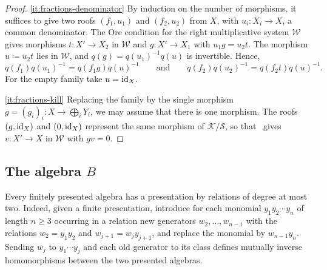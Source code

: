 \begin{proof}
  \eqref{it:fractions-denominator} By induction on the number of morphisms, it
  suffices to give two roofs $(f_1,u_1)$ and $(f_2,u_2)$ from $X$, with
  ${u_i\colon X_i\to X}$, a common denominator. The Ore condition for the right
  multiplicative system $\mathcal{W}$~\cite[Tag~04VC,
  Definition~4.27.1]{Stacks} gives morphisms ${t\colon X'\to X_2}$ in
  $\mathcal{W}$ and ${g\colon X'\to X_1}$ with ${u_1g=u_2t}$. The morphism
  ${u\coloneqq u_2t}$ lies in $\mathcal{W}$, and ${q(g)=q(u_1)^{-1}q(u)}$ is
  invertible. Hence,
  \[
    q(f_1)q(u_1)^{-1}=q(f_1g)q(u)^{-1}\qquad\text{and}\qquad
    q(f_2)q(u_2)^{-1}=q(f_2t)q(u)^{-1}.
  \]
  For the empty family take ${u=\id[X]}$.

  \eqref{it:fractions-kill} Replacing the family by the single morphism
  ${g=(g_i)_i\colon X\to\bigoplus_iY_i}$, we may assume that there is one
  morphism. The roofs $(g,\id[X])$ and $(0,\id[X])$ represent the same morphism
  of $\mathcal{K}/\mathcal{S}$, so that~\cite[Tag~04VJ, Lemma~4.27.14]{Stacks}
  gives ${v\colon X'\to X}$ in $\mathcal{W}$ with ${gv=0}$.
\end{proof}

\subsection{The algebra \texorpdfstring{$B$}{B}}
\label{subsec:encoding}

Every finitely presented algebra has a presentation by relations of degree at
most two. Indeed, given a finite presentation, introduce for each monomial
$y_1y_2\cdots y_n$ of length ${n\geq3}$ occurring in a relation new generators
$w_2,\dots,w_{n-1}$ with the relations ${w_2=y_1y_2}$ and ${w_{j+1}=w_jy_{j+1}}$,
and replace the monomial by $w_{n-1}y_n$. Sending $w_j$ to $y_1\cdots y_j$ and
each old generator to its class defines mutually inverse homomorphisms between
the two presented algebras.

